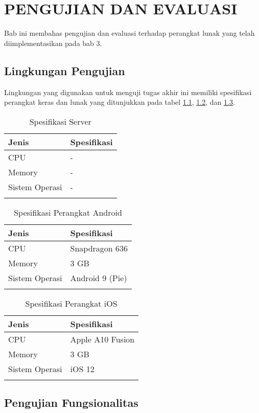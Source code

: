 \chapter{PENGUJIAN DAN EVALUASI}
\par Bab ini membahas pengujian dan evaluasi terhadap perangkat lunak yang telah diimplementasikan pada bab 3.

\section{Lingkungan Pengujian}
\par Lingkungan yang digunakan untuk menguji tugas akhir ini memiliki spesifikasi perangkat keras dan lunak yang ditunjukkan pada tabel \ref{5:tabel_spesifikasi_server}, \ref{5:tabel_spesifikasi_perangkat_android}, dan \ref{5:tabel_spesifikasi_perangkat_ios}.
\begin{longtable}{|p{2.5cm}|p{6.5cm}|}
    \hline
    \textbf{Jenis} & \textbf{Spesifikasi} \\ \hline
    CPU & - \\ \hline
    Memory & - \\ \hline
    Sistem Operasi & - \\ \hline
    \caption{Spesifikasi Server}
    \label{5:tabel_spesifikasi_server}
\end{longtable}
\begin{longtable}{|p{2.5cm}|p{6.5cm}|}
    \hline
    \textbf{Jenis} & \textbf{Spesifikasi} \\ \hline
    CPU & Snapdragon 636 \\ \hline
    Memory & 3 GB \\ \hline
    Sistem Operasi & Android 9 (Pie) \\ \hline
    \caption{Spesifikasi Perangkat Android}
    \label{5:tabel_spesifikasi_perangkat_android}
\end{longtable}
\begin{longtable}{|p{2.5cm}|p{6.5cm}|}
    \hline
    \textbf{Jenis} & \textbf{Spesifikasi} \\ \hline
    CPU & Apple A10 Fusion \\ \hline
    Memory & 3 GB \\ \hline
    Sistem Operasi & iOS 12 \\ \hline
    \caption{Spesifikasi Perangkat iOS}
    \label{5:tabel_spesifikasi_perangkat_ios}
\end{longtable}

\section{Pengujian Fungsionalitas}

